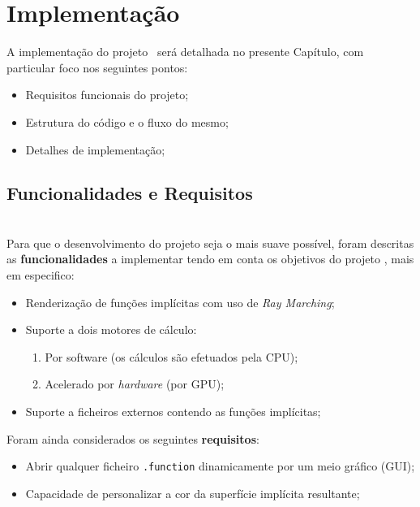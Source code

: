 \chapter{Implementação}
\label{ch::impl}


A implementação do projeto \theapp~será detalhada no presente Capítulo, com particular foco nos seguintes pontos:

\begin{itemize}[nosep]
	\item Requisitos funcionais do projeto;
	\item Estrutura do código e o fluxo do mesmo;
	\item Detalhes de implementação;
\end{itemize}


\section{Funcionalidades e Requisitos}
\label{sec::impl:requisitos}

\\
Para que o desenvolvimento do projeto seja o mais suave possível, foram descritas as \textbf{funcionalidades} a implementar tendo em conta os objetivos do projeto , mais em especifico:

\begin{itemize}
    \item Renderização de funções implícitas com uso de \textit{Ray Marching};
    \item Suporte a dois motores de cálculo:
    \begin{enumerate}
        \item Por software (os cálculos são efetuados pela \ac{CPU});
        \item Acelerado por \textit{hardware} (por \ac{GPU});
    \end{enumerate}
    \item Suporte a ficheiros externos contendo as funções implícitas;
\end{itemize}

Foram ainda considerados os seguintes \textbf{requisitos}:
\begin{itemize}
    \item Abrir qualquer ficheiro \verb*|.function| dinamicamente por um meio gráfico (\ac{GUI});
    \item Capacidade de personalizar a cor da superfície implícita resultante;
\end{itemize}


